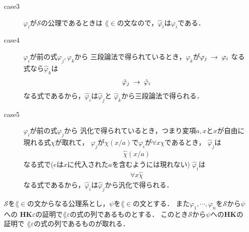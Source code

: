 \begin{metaprf}
\begin{description}
			\item[case3] $\varphi_{i}$が$\mathscr{S}$の公理であるときは
				$\lang{\in}$の文なので，$\hat{\varphi}_{i}$は$\varphi_{i}$である．
				
			\item[case4] $\varphi_{i}$が前の式$\varphi_{j},\varphi_{k}$から
				三段論法で得られているとき，$\varphi_{k}$が$\varphi_{j} \hspace{0.25em}\rightarrow\hspace{0.25em} \varphi_{i}$
				なる式なら$\hat{\varphi}_{k}$は
				\begin{align}
					\hat{\varphi}_{j} \hspace{0.25em}\rightarrow\hspace{0.25em} \hat{\varphi}_{i}
				\end{align}
				なる式であるから，$\hat{\varphi}_{i}$は$\hat{\varphi}_{j}$と
				$\hat{\varphi}_{k}$から三段論法で得られる．
				
			\item[case5] $\varphi_{i}$が前の式$\varphi_{j}$から
				汎化で得られているとき，つまり変項$a,x$と$x$が自由に現れる式$\chi$が取れて，
				$\varphi_{j}$が$\chi(x/a)$で$\varphi_{i}$が$\forall x \chi$であるとき，
				$\hat{\varphi}_{j}$は
				\begin{align}
					\hat{\chi}(x/a)
				\end{align}
				なる式で($e$は$x$に代入された$a$を含むようには現れない)
				$\hat{\varphi}_{i}$は
				\begin{align}
					\forall x \hat{\chi}
				\end{align}
				なる式であるから，$\hat{\varphi}_{i}$は$\hat{\varphi}_{j}$から汎化で得られる．
				\QED
		\end{description}
	\end{metaprf}
	
	\begin{screen}
		\begin{metathm}
		\label{metathm:Henkin_expansion_2}
			$\mathscr{S}$を$\lang{\in}$の文からなる公理系とし，$\psi$を$\lang{\in}$の文とする．
			また$\varphi_{1},\cdots,\varphi_{n}$を$\mathscr{S}$から$\psi$への
			{\bf HK$\varepsilon$}の証明で$\lang{\varepsilon}$の式の列であるものとする．
			このとき$\mathscr{S}$から$\psi$への{\bf HK}の証明で
			$\lang{\varepsilon}$の式の列であるものが取れる．
		\end{metathm}
	\end{screen}
	
